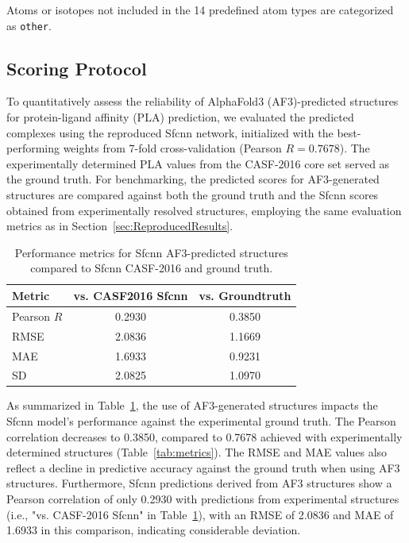 \documentclass[unnumsec,webpdf,contemporary,large]{oup-authoring-template}
\theoremstyle{thmstyleone}%
\theoremstyle{thmstyletwo}%
\theoremstyle{thmstylethree}%
\begin{document}
Atoms or isotopes not included in the 14 predefined atom types are 
categorized as \texttt{other}.

\subsection{Scoring Protocol}
To quantitatively assess the reliability of AlphaFold3 (AF3)-predicted structures 
for protein-ligand affinity (PLA) prediction, we evaluated the predicted complexes 
using the reproduced Sfcnn network, initialized with the best-performing weights from 
7-fold cross-validation (Pearson $R = 0.7678$). The experimentally determined PLA values from the 
CASF-2016 core set served as the ground truth. 
For benchmarking, the predicted scores for AF3-generated structures are compared 
against both the ground truth and the Sfcnn scores obtained from experimentally 
resolved structures, employing the same evaluation metrics as 
in Section~\ref{sec:ReproducedResults}.

\begin{table}[H]
\centering
\caption{Performance metrics for Sfcnn AF3-predicted structures compared to Sfcnn CASF-2016 and ground truth.}
\label{tab:af3_metrics}
\begin{tabular}{lcc}
\toprule
Metric & vs. CASF2016 Sfcnn & vs. Groundtruth \\
\midrule
Pearson $R$ & 0.2930 & 0.3850 \\
RMSE        & 2.0836 & 1.1669 \\
MAE         & 1.6933 & 0.9231 \\
SD          & 2.0825 & 1.0970 \\
\bottomrule
\end{tabular}
\end{table}

As summarized in Table~\ref{tab:af3_metrics}, 
the use of AF3-generated structures impacts the Sfcnn model's performance against the experimental ground truth. 
The Pearson correlation decreases to 0.3850, compared to 0.7678 achieved with experimentally determined structures (Table~\ref{tab:metrics}). 
The RMSE and MAE values also reflect a decline in predictive accuracy against the ground truth when using AF3 structures. 
Furthermore, Sfcnn predictions derived from AF3 structures show a Pearson correlation of only 0.2930 
with predictions from experimental structures (i.e., "vs. CASF-2016 Sfcnn" in Table~\ref{tab:af3_metrics}), 
with an RMSE of 2.0836 and MAE of 1.6933 in this comparison, indicating considerable deviation.
\end{document}
